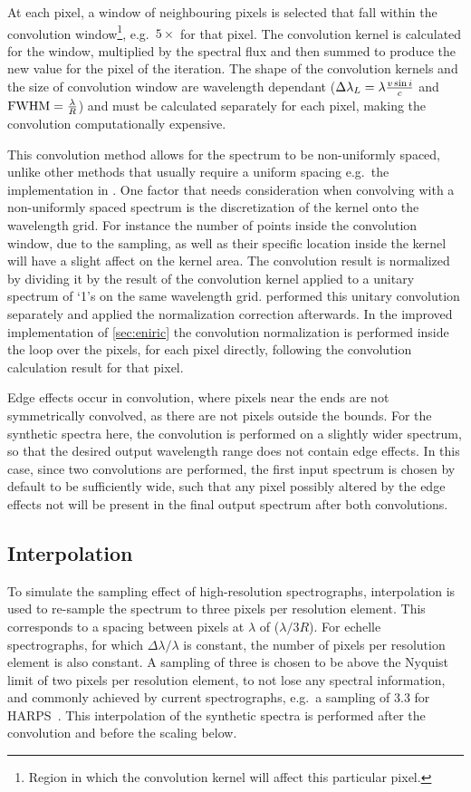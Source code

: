 At each pixel, a window of neighbouring pixels is selected that fall within the convolution window\footnote{Region in which the convolution kernel will affect this particular pixel.}, e.g.\ \(5\times\)\fwhm{} for that pixel.
The convolution kernel is calculated for the window, multiplied by the spectral flux and then summed to produce the new value for the pixel of the iteration.
The shape of the convolution kernels and the size of convolution window are wavelength dependant (\(\Delta\lambda_{L}=\lambda \frac{v\sin{i}}{c}\) and \({\textrm{FWHM}}=\frac{\lambda}{R}\)) and must be calculated separately for each pixel, making the convolution computationally expensive.

This convolution method allows for the spectrum to be non-uniformly spaced, unlike other methods that usually require a uniform spacing e.g.\ the implementation in \pyastronomy{}.
One factor that needs consideration when convolving with a non-uniformly spaced spectrum is the discretization of the kernel onto the wavelength grid.
For instance the number of points inside the convolution window, due to the sampling, as well as their specific location inside the kernel will have a slight affect on the kernel area.
The convolution result is normalized by dividing it by the result of the convolution kernel applied to a unitary spectrum of `1's on the same wavelength grid.
\citet{figueira_radial_2016} performed this unitary convolution separately and applied the normalization correction afterwards.
In the improved implementation of \cref{sec:eniric} the convolution normalization is performed inside the loop over the pixels, for each pixel directly, following the convolution calculation result for that pixel.

Edge effects occur in convolution, where pixels near the ends are not symmetrically convolved, as there are not pixels outside the bounds. 
For the synthetic spectra here, the convolution is performed on a slightly wider spectrum, so that the desired output wavelength range does not contain edge effects.
In this case, since two convolutions are performed, the first input spectrum is chosen by default to be sufficiently wide, such that any pixel possibly altered by the edge effects not will be present in the final output spectrum after both convolutions.

\subsection{Interpolation}
\label{subsec:orginal_interpolation}
To simulate the sampling effect of high-resolution spectrographs, interpolation is used to re-sample the spectrum to three pixels per resolution element.
This corresponds to a spacing between pixels at \(\lambda\) of (\(\lambda / 3R\)).
For echelle spectrographs, for which \(\Delta\lambda/\lambda\) is constant, the number of pixels per resolution element is also constant.
A sampling of three is chosen to be above the Nyquist limit of two pixels per resolution element, to not lose any spectral information, and commonly achieved by current spectrographs, e.g.\ a sampling of 3.3 for HARPS~\citep{mayor_setting_2003}.
This interpolation of the synthetic spectra is performed after the convolution and before the \snr{} scaling below.

